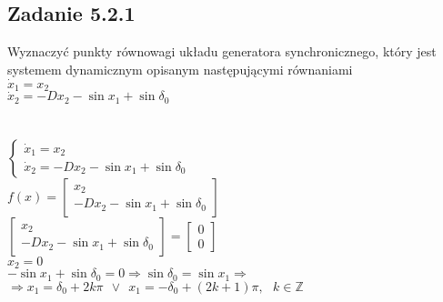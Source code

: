 
\pagebreak
\subsection*{Zadanie 5.2.1} {\color{darkgray}
	Wyznaczyć punkty równowagi układu generatora synchronicznego, który jest systemem dynamicznym opisanym następującymi równaniami\\
	$\dot{x}_1=x_2$\\
	$\dot{x}_2=-Dx_2-\sin x_1 + \sin \delta_0$\\
}\lineh
\\\\
$\begin{cases}\dot{x}_1=x_2 \\ \dot{x}_2=-Dx_2-\sin x_1 + \sin \delta_0 \end{cases}$\\
$f(x)= \left[ \begin{array}{c}   x_2  \\  -Dx_2-\sin x_1 + \sin \delta_0  \end{array}\right]$\\
$\left[ \begin{array}{c}   x_2  \\  -Dx_2-\sin x_1 + \sin \delta_0  \end{array}\right] = \left[ \begin{array}{c}  0\\0  \end{array}\right]$\\
$x_2=0$\\
$-\sin x_1 + \sin \delta_0 = 0 \Rightarrow \sin\delta_0=\sin x_1 \Rightarrow$\\
$\Rightarrow x_1=\delta_0+2k\pi \ \ \vee\ \  x_1=-\delta_0+(2k+1)\pi, \ \ \ k \in \mathbb{Z}$\\




\pagebreak
